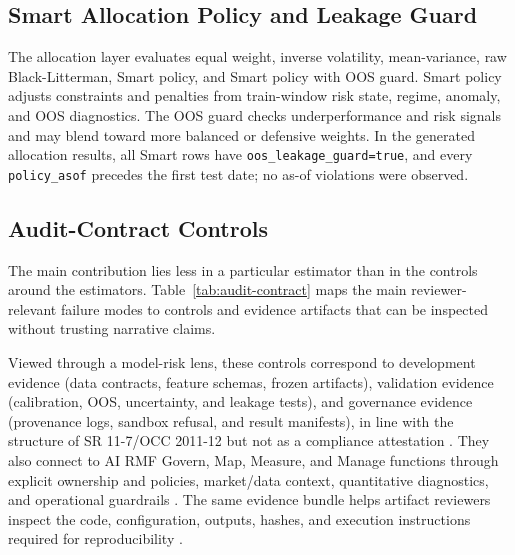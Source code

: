 \documentclass{ieeeaccess}
\begin{document}
\subsection{Smart Allocation Policy and Leakage Guard}
The allocation layer evaluates equal weight, inverse volatility, mean-variance, raw Black-Litterman, Smart policy, and Smart policy with OOS guard. Smart policy adjusts constraints and penalties from train-window risk state, regime, anomaly, and OOS diagnostics. The OOS guard checks underperformance and risk signals and may blend toward more balanced or defensive weights. In the generated allocation results, all Smart rows have \texttt{oos\_leakage\_guard=true}, and every \texttt{policy\_asof} precedes the first test date; no as-of violations were observed.

\subsection{Audit-Contract Controls}
The main contribution lies less in a particular estimator than in the controls around the estimators. Table~\ref{tab:audit-contract} maps the main reviewer-relevant failure modes to controls and evidence artifacts that can be inspected without trusting narrative claims.

Viewed through a model-risk lens, these controls correspond to development evidence (data contracts, feature schemas, frozen artifacts), validation evidence (calibration, OOS, uncertainty, and leakage tests), and governance evidence (provenance logs, sandbox refusal, and result manifests), in line with the structure of SR 11-7/OCC 2011-12 but not as a compliance attestation \cite{FederalReserveOCC2011SR117ModelRisk}. They also connect to AI RMF Govern, Map, Measure, and Manage functions through explicit ownership and policies, market/data context, quantitative diagnostics, and operational guardrails \cite{Tabassi2023NISTAIRMF}. The same evidence bundle helps artifact reviewers inspect the code, configuration, outputs, hashes, and execution instructions required for reproducibility \cite{IEEEAccessReproducibility2026}.
\end{document}
